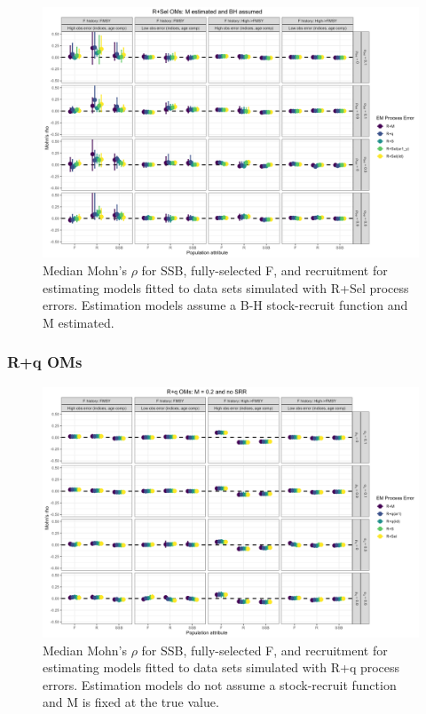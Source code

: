 \documentclass[
  12pt,
]{article}
\begin{document}
\begin{landscape}
\begin{figure}
\caption{Median Mohn's $\rho$ for SSB, fully-selected F, and recruitment for estimating models fitted to data sets simulated with R+Sel process errors.  Estimation models assume a B-H stock-recruit function and M estimated.}\label{Sel_om_em_BH_ME_mohns_rho}
\begin{center}
\includegraphics[width = \textwidth]{Sel_om_mohns_rho_BH_ME.png}
\end{center}
\end{figure}
\end{landscape}

\hypertarget{rq-oms-1}{%
\subsubsection*{R+q OMs}\label{rq-oms-1}}

\begin{landscape}
\begin{figure}
\caption{Median Mohn's $\rho$ for SSB, fully-selected F, and recruitment for estimating models fitted to data sets simulated with R+q process errors.  Estimation models do not assume a stock-recruit function and M is fixed at the true value.}\label{q_om_em_R_MF_mohns_rho}
\begin{center}
\includegraphics[width = \textwidth]{q_om_mohns_rho_R_MF.png}
\end{center}
\end{figure}
\end{landscape}
\end{document}
